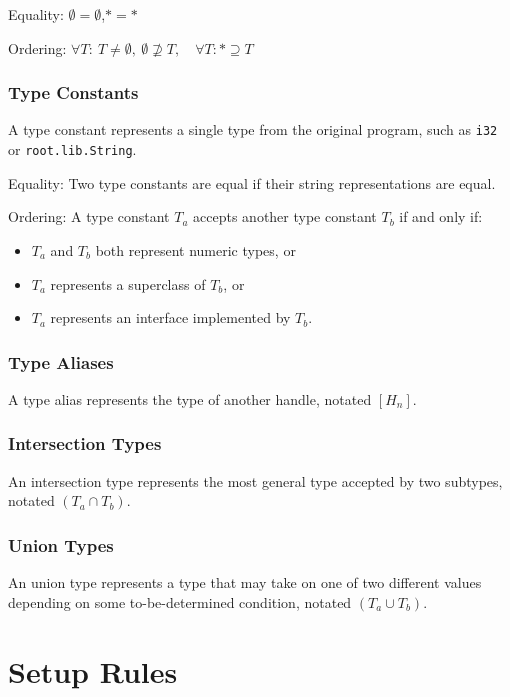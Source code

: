 \documentclass{article}
\begin{document}
Equality: $\emptyset = \emptyset$,\quad$\ast = \ast$

Ordering: $\forall T:\: T \not= \emptyset,\:\emptyset \not\supseteq T,\quad\forall T: \ast \supseteq T$

\subsubsection{Type Constants}

A type constant represents a single type from the original program, such as \texttt{i32} or \texttt{root.lib.String}.

Equality: Two type constants are equal if their string representations are equal.

Ordering: A type constant $T_a$ accepts another type constant $T_b$ if and only if:

\begin{itemize}
    \item $T_a$ and $T_b$ both represent numeric types, or
    \item $T_a$ represents a superclass of $T_b$, or
    \item $T_a$ represents an interface implemented by $T_b$.
\end{itemize}

\subsubsection{Type Aliases}

A type alias represents the type of another handle, notated $[H_n]$.

\subsubsection{Intersection Types}

An intersection type represents the most general type accepted by two subtypes, notated $(T_a \cap T_b)$.

\subsubsection{Union Types}

An union type represents a type that may take on one of two different values depending on some to-be-determined condition, notated $(T_a \cup T_b)$.

\section{Setup Rules}
\end{document}

